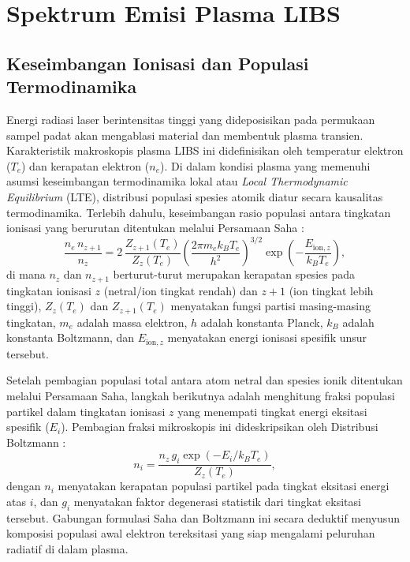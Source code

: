 
\section{Spektrum Emisi Plasma LIBS}

\subsection{Keseimbangan Ionisasi dan Populasi Termodinamika} \label{subsec:bab2_sahaboltzmann}

Energi radiasi laser berintensitas tinggi yang dideposisikan pada permukaan sampel padat akan mengablasi material dan membentuk plasma transien. Karakteristik makroskopis plasma LIBS ini didefinisikan oleh temperatur elektron ($T_e$) dan kerapatan elektron ($n_e$). Di dalam kondisi plasma yang memenuhi asumsi keseimbangan termodinamika lokal atau \textit{Local Thermodynamic Equilibrium} (LTE), distribusi populasi spesies atomik diatur secara kausalitas termodinamika. Terlebih dahulu, keseimbangan rasio populasi antara tingkatan ionisasi yang berurutan ditentukan melalui Persamaan Saha \citep{fujimoto_plasma_2004}:
\begin{equation} \label{eq:bab2_saha}
\frac{n_e \, n_{z+1}}{n_z} = 2\,\frac{Z_{z+1}(T_e)}{Z_z(T_e)} \left(\frac{2\pi m_e k_B T_e}{h^2}\right)^{3/2} \exp\!\left(-\frac{E_{\mathrm{ion},z}}{k_B T_e}\right),
\end{equation}
di mana $n_z$ dan $n_{z+1}$ berturut-turut merupakan kerapatan spesies pada tingkatan ionisasi $z$ (netral/ion tingkat rendah) dan $z+1$ (ion tingkat lebih tinggi), $Z_z(T_e)$ dan $Z_{z+1}(T_e)$ menyatakan fungsi partisi masing-masing tingkatan, $m_e$ adalah massa elektron, $h$ adalah konstanta Planck, $k_B$ adalah konstanta Boltzmann, dan $E_{\mathrm{ion},z}$ menyatakan energi ionisasi spesifik unsur tersebut.

Setelah pembagian populasi total antara atom netral dan spesies ionik ditentukan melalui Persamaan Saha, langkah berikutnya adalah menghitung fraksi populasi partikel dalam tingkatan ionisasi $z$ yang menempati tingkat energi eksitasi spesifik ($E_i$). Pembagian fraksi mikroskopis ini dideskripsikan oleh Distribusi Boltzmann \citep{fujimoto_plasma_2004}:
\begin{equation} \label{eq:bab2_boltzmann}
n_i = \frac{n_z \, g_i \exp(-E_i / k_B T_e)}{Z_z(T_e)},
\end{equation}
dengan $n_i$ menyatakan kerapatan populasi partikel pada tingkat eksitasi energi atas $i$, dan $g_i$ menyatakan faktor degenerasi statistik dari tingkat eksitasi tersebut. Gabungan formulasi Saha dan Boltzmann ini secara deduktif menyusun komposisi populasi awal elektron tereksitasi yang siap mengalami peluruhan radiatif di dalam plasma.

